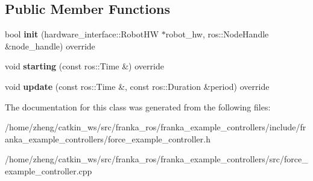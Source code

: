 \subsection*{Public Member Functions}
\begin{DoxyCompactItemize}
\item 
\mbox{\label{classfranka__example__controllers_1_1_force_example_controller_adb9839ab5bf49901849839bb5ce73932}} 
bool {\bfseries init} (hardware\+\_\+interface\+::\+Robot\+HW $\ast$robot\+\_\+hw, ros\+::\+Node\+Handle \&node\+\_\+handle) override
\item 
\mbox{\label{classfranka__example__controllers_1_1_force_example_controller_aaf7bd3ab431911c818d1c3bf312f4f02}} 
void {\bfseries starting} (const ros\+::\+Time \&) override
\item 
\mbox{\label{classfranka__example__controllers_1_1_force_example_controller_ae15ee13e9cb72653edb468127e65fa3c}} 
void {\bfseries update} (const ros\+::\+Time \&, const ros\+::\+Duration \&period) override
\end{DoxyCompactItemize}


The documentation for this class was generated from the following files\+:\begin{DoxyCompactItemize}
\item 
/home/zheng/catkin\+\_\+ws/src/franka\+\_\+ros/franka\+\_\+example\+\_\+controllers/include/franka\+\_\+example\+\_\+controllers/force\+\_\+example\+\_\+controller.\+h\item 
/home/zheng/catkin\+\_\+ws/src/franka\+\_\+ros/franka\+\_\+example\+\_\+controllers/src/force\+\_\+example\+\_\+controller.\+cpp\end{DoxyCompactItemize}

